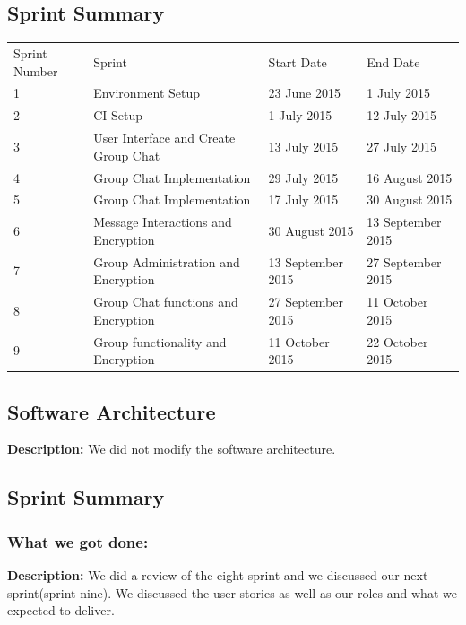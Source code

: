 \documentclass[a4paper]{article}
\begin{document}
\subsection{Sprint Summary}
\setlength{\arrayrulewidth}{0.5mm}
\setlength{\tabcolsep}{12pt}
\renewcommand{\arraystretch}{2} 
\begin{tabular}{ |p{2.5cm}|p{2.5cm}|p{2.5cm} |p{2.5cm}| }
\hline
\rowcolor{lightgray}\multicolumn{4}{|c|}{Sprint Summary} \\
\hline
Sprint Number & Sprint & Start Date & End Date\\
\hline 
1 & Environment Setup & 23 June 2015 & 1 July 2015 \\
\hline
2 & CI Setup & 1 July 2015 & 12 July 2015 \\
\hline
3 & User Interface  and Create Group Chat & 13 July 2015 & 27 July 2015 \\
\hline
4 & Group Chat Implementation & 29 July 2015 & 16 August 2015 \\
\hline
5 & Group Chat Implementation & 17 July 2015 & 30 August 2015 \\
\hline
6 & Message Interactions and Encryption & 30 August 2015 & 13 September 2015 \\
\hline
7 & Group Administration and Encryption & 13 September 2015 & 27 September 2015 \\
\hline
8 & Group Chat functions and Encryption & 27 September 2015 & 11 October 2015 \\
\hline
9 & Group functionality and Encryption & 11 October 2015 & 22 October 2015 \\
\hline
\end{tabular}

\subsection{Software Architecture}
\textbf{Description: }We did not modify the software architecture. \\

\subsection{Sprint Summary}
\subsubsection{What we got done: }
\textbf{Description: }We did a review of the eight sprint and we discussed our next sprint(sprint nine). We discussed the user stories as well as our roles and what we expected to deliver. \\
\end{document}
